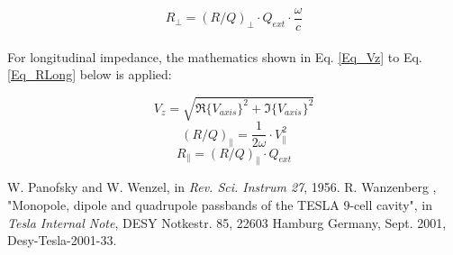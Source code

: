 \documentclass[12pt]{article}
\begin{document}
\begin{equation}\label{Eq_RTransx}
R_{\perp} = (R/Q)_{\perp} \cdot Q_{ext} \cdot \dfrac{\omega}{c}
\end{equation}
\\
For longitudinal impedance, the mathematics shown in Eq. \ref{Eq_Vz} to Eq. \ref{Eq_RLong} below is applied:

\begin{equation}\label{Eq_Vz}
V_{z} = \sqrt{\Re{\{V_{axis}\}}^2 + \Im{\{V_{axis}\}}^2}
\end{equation}
\begin{equation}\label{Eq_R/QLong}
(R/Q)_{\parallel} = \dfrac{1}{2\omega} \cdot V_{\parallel}^2
\end{equation}
\begin{equation}\label{Eq_RLong}
R_{\parallel} = (R/Q)_\parallel \cdot Q_{ext}
\end{equation}

\begin{thebibliography}{99}

	W. Panofsky and W. Wenzel,  
	in \textit{Rev. Sci. Instrum 27}, 
	1956.
	R. Wanzenberg ,
	"Monopole, dipole and quadrupole passbands of the TESLA 9-cell cavity",
	in \textit{Tesla Internal Note}, 
	DESY Notkestr. 85, 22603 Hamburg Germany, Sept. 2001, 
	Desy-Tesla-2001-33.

\end{thebibliography}
\end{document}
